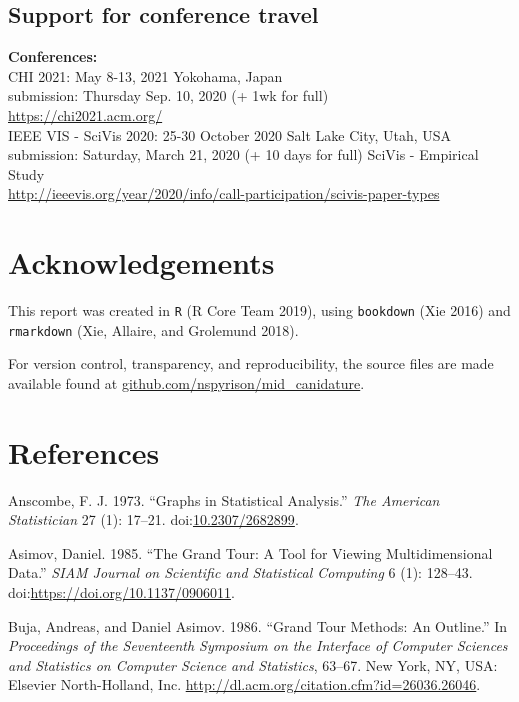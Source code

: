 \documentclass[11,]{article}
\theoremstyle{definition}
\theoremstyle{definition}
\theoremstyle{definition}
\theoremstyle{remark}
\begin{document}
\subsection{Support for conference
travel}\label{support-for-conference-travel}

\textbf{Conferences:}\\[2\baselineskip]CHI 2021: May 8-13, 2021
Yokohama, Japan\\
submission: Thursday Sep. 10, 2020 (+ 1wk for full)\\
\url{https://chi2021.acm.org/}\\[2\baselineskip]IEEE VIS - SciVis 2020:
25-30 October 2020 Salt Lake City, Utah, USA\\
submission: Saturday, March 21, 2020 (+ 10 days for full) SciVis -
Empirical Study\\
\url{http://ieeevis.org/year/2020/info/call-participation/scivis-paper-types}

\section{Acknowledgements}\label{sec:acknowledgements}

This report was created in \texttt{R} (R Core Team 2019), using
\texttt{bookdown} (Xie 2016) and \texttt{rmarkdown} (Xie, Allaire, and
Grolemund 2018).

For version control, transparency, and reproducibility, the source files
are made available found at
\href{https://github.com/nspyrison/mid_canidature}{github.com/nspyrison/mid\_canidature}.

\section*{References}\label{references}

\hypertarget{refs}{}
\hypertarget{ref-anscombe_graphs_1973}{}
Anscombe, F. J. 1973. ``Graphs in Statistical Analysis.'' \emph{The
American Statistician} 27 (1): 17--21.
doi:\href{https://doi.org/10.2307/2682899}{10.2307/2682899}.

\hypertarget{ref-asimov_grand_1985}{}
Asimov, Daniel. 1985. ``The Grand Tour: A Tool for Viewing
Multidimensional Data.'' \emph{SIAM Journal on Scientific and
Statistical Computing} 6 (1): 128--43.
doi:\href{https://doi.org/https://doi.org/10.1137/0906011}{https://doi.org/10.1137/0906011}.

\hypertarget{ref-buja_grand_1986}{}
Buja, Andreas, and Daniel Asimov. 1986. ``Grand Tour Methods: An
Outline.'' In \emph{Proceedings of the Seventeenth Symposium on the
Interface of Computer Sciences and Statistics on Computer Science and
Statistics}, 63--67. New York, NY, USA: Elsevier North-Holland, Inc.
\url{http://dl.acm.org/citation.cfm?id=26036.26046}.
\end{document}

